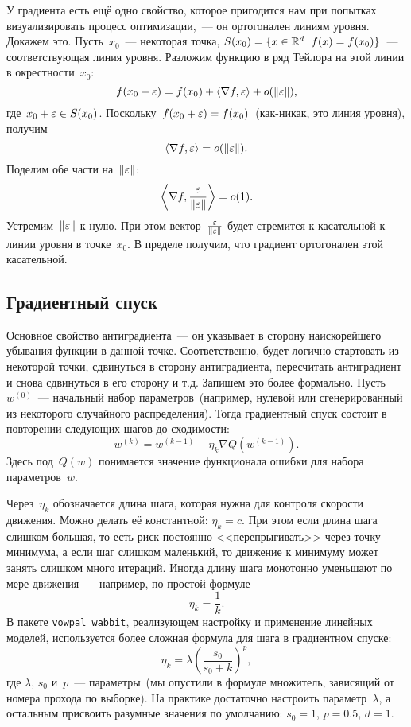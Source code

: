 \documentclass[12pt,fleqn]{article}
\begin{document}
У градиента есть ещё одно свойство, которое пригодится нам при попытках
визуализировать процесс оптимизации,~--- он ортогонален линиям уровня.
Докажем это.
Пусть~$x_0$~--- некоторая точка,
$S(x_0) = \{x \in \mathbb{R}^d \mspace{3mu}{|}\mspace{3mu} f(x) = f(x_0)\}$~--- соответствующая линия уровня.
Разложим функцию в ряд Тейлора на этой линии в окрестности~$x_0$:
\[
    f(x_0 + \varepsilon) = f(x_0) + \langle \nabla f, \varepsilon \rangle + o(\|\varepsilon\|),
\]
где~$x_0 + \varepsilon \in S(x_0)$.
Поскольку~$f(x_0 + \varepsilon) = f(x_0)$~(как-никак, это линия уровня), получим
\[
    \langle \nabla f, \varepsilon \rangle = o(\|\varepsilon\|).
\]
Поделим обе части на~$\|\varepsilon\|$:
\[
    \left\langle \nabla f, \frac{\varepsilon}{\|\varepsilon\|} \right\rangle = o(1).
\]
Устремим~$\|\varepsilon\|$ к нулю.
При этом вектор~$\frac{\varepsilon}{\|\varepsilon\|}$ будет стремится к касательной к линии уровня в точке~$x_0$.
В пределе получим, что градиент ортогонален этой касательной.

\subsection{Градиентный спуск}

Основное свойство антиградиента~--- он указывает в сторону наискорейшего убывания функции в данной точке.
Соответственно, будет логично стартовать из некоторой точки, сдвинуться в сторону антиградиента,
пересчитать антиградиент и снова сдвинуться в его сторону и т.д.
Запишем это более формально.
Пусть~$w^{(0)}$~--- начальный набор параметров~(например, нулевой или сгенерированный из некоторого
случайного распределения).
Тогда градиентный спуск состоит в повторении следующих шагов до сходимости:
\begin{equation}
\label{eq:fullgrad}
    w^{(k)}
    =
    w^{(k - 1)}
    -
    \eta_k
    \nabla Q(w^{(k - 1)}).
\end{equation}
Здесь под~$Q(w)$ понимается значение функционала ошибки для набора параметров~$w$.

Через~$\eta_k$ обозначается длина шага, которая нужна для контроля скорости движения.
Можно делать её константной: $\eta_k = c$.
При этом если длина шага слишком большая, то есть риск постоянно <<перепрыгивать>> через точку минимума,
а если шаг слишком маленький, то движение к минимуму может занять слишком много итераций.
Иногда длину шага монотонно уменьшают по мере движения~--- например, по простой формуле
\[
    \eta_k
    =
    \frac{1}{k}.
\]
В пакете \texttt{vowpal wabbit}, реализующем настройку и применение линейных моделей,
используется более сложная формула для шага в градиентном спуске:
\[
    \eta_k
    =
    \lambda
    \left(
        \frac{s_0}{s_0 + k}
    \right)^p,
\]
где $\lambda$, $s_0$ и~$p$~--- параметры~(мы опустили в формуле множитель, зависящий от номера прохода по выборке).
На практике достаточно настроить параметр~$\lambda$, а остальным
присвоить разумные значения по умолчанию: $s_0 = 1$, $p = 0.5$, $d = 1$.
\end{document}
